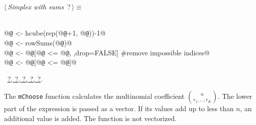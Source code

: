 \documentclass[reqno]{amsart}
\renewcommand{\NWtarget}[2]{\hypertarget{#1}{#2}}
\renewcommand{\NWlink}[2]{\hyperlink{#1}{#2}}
\begin{document}
\begin{flushleft} \small
\begin{minipage}{\linewidth}\label{scrap45}\raggedright\small
\NWtarget{nuweb?}{} $\langle\,${\itshape Simplex with sums}\nobreak\ {\footnotesize {?}}$\,\rangle\equiv$
\vspace{-1ex}
\begin{list}{}{} \item
\mbox{}\verb@@\\
\mbox{}\verb@   @{\tt @} <- hcube(rep(@{\tt @}+1, @{\tt @}))-1@\\
\mbox{}\verb@   @{\tt @} <- rowSums(@{\tt @})@\\
\mbox{}\verb@   @{\tt @} <- @{\tt @}[@{\tt @} <= @{\tt @}, ,drop=FALSE]  #remove impossible indices@\\
\mbox{}\verb@   @{\tt @} <- @{\tt @}[@{\tt @} <= @{\tt @}]@\\
\mbox{}\verb@@{\NWsep}
\end{list}
\vspace{-1.5ex}
\footnotesize
\begin{list}{}{\setlength{\itemsep}{-\parsep}\setlength{\itemindent}{-\leftmargin}}
\item \NWtxtMacroRefIn\ \NWlink{nuweb?}{?}\NWlink{nuweb?}{, ?}\NWlink{nuweb?}{, ?}\NWlink{nuweb?}{, ?}\NWlink{nuweb?}{, ?}.

\item{}
\end{list}
\end{minipage}\vspace{4ex}
\end{flushleft}
The \texttt{mChoose} function calculates the multinomial coefficient $\binom{n}{r_1,\ldots,r_K}$. The lower
part of the expression is passed as a vector. If its values add up to less than $n$, an additional value
is added. The function is not vectorized.
\end{document}

